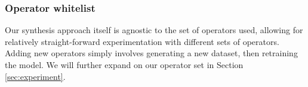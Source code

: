\documentclass{article} %
\begin{document}




\subsubsection{Operator whitelist}

Our synthesis approach itself is agnostic to the set of operators used,
allowing for relatively straight-forward experimentation with different sets of operators.
Adding new operators simply involves generating a new dataset, then retraining the model.
%
We will further expand on our operator set
in Section \ref{sec:experiment}.
\end{document}
